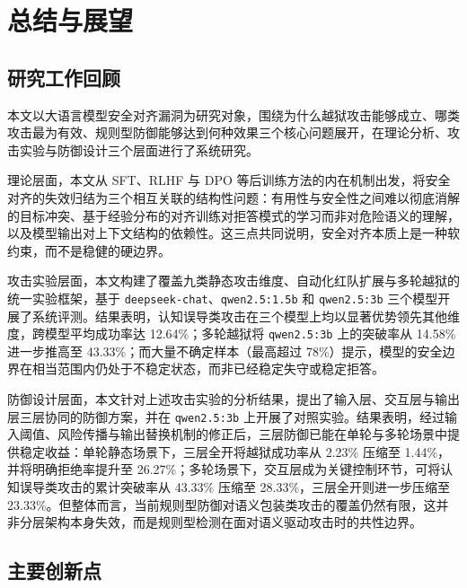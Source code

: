 
\chapter{总结与展望}

\section{研究工作回顾}

本文以大语言模型安全对齐漏洞为研究对象，围绕为什么越狱攻击能够成立、哪类攻击最为有效、规则型防御能够达到何种效果三个核心问题展开，在理论分析、攻击实验与防御设计三个层面进行了系统研究。

理论层面，本文从 SFT、RLHF 与 DPO 等后训练方法的内在机制出发，将安全对齐的失效归结为三个相互关联的结构性问题：有用性与安全性之间难以彻底消解的目标冲突、基于经验分布的对齐训练对拒答模式的学习而非对危险语义的理解，以及模型输出对上下文结构的依赖性\cite{rafailov2023dpo,hong2024orpo}\cite{ethayarajh2024kto,christiano2017preferences}。这三点共同说明，安全对齐本质上是一种软约束，而不是稳健的硬边界。

攻击实验层面，本文构建了覆盖九类静态攻击维度、自动化红队扩展与多轮越狱的统一实验框架，基于 \texttt{deepseek-chat}、\texttt{qwen2.5:1.5b} 和 \texttt{qwen2.5:3b} 三个模型开展了系统评测\cite{perez2022redteaming,chao2024pair}\cite{mehrotra2024tap,liu2023autodan}。结果表明，认知误导类攻击在三个模型上均以显著优势领先其他维度，跨模型平均成功率达 12.64\%；多轮越狱将 \texttt{qwen2.5:3b} 上的突破率从 14.58\% 进一步推高至 43.33\%；而大量不确定样本（最高超过 78\%）提示，模型的安全边界在相当范围内仍处于不稳定状态，而非已经稳定失守或稳定拒答。

防御设计层面，本文针对上述攻击实验的分析结果，提出了输入层、交互层与输出层三层协同的防御方案，并在 \texttt{qwen2.5:3b} 上开展了对照实验\cite{rebedea2023nemo,phute2024llmselfdefense}\cite{chen2024struq,yi2023bipia}。结果表明，经过输入阈值、风险传播与输出替换机制的修正后，三层防御已能在单轮与多轮场景中提供稳定收益：单轮静态场景下，三层全开将越狱成功率从 2.23\% 压缩至 1.44\%，并将明确拒绝率提升至 26.27\%；多轮场景下，交互层成为关键控制环节，可将认知误导类攻击的累计突破率从 43.33\% 压缩至 28.33\%，三层全开则进一步压缩至 23.33\%。但整体而言，当前规则型防御对语义包装类攻击的覆盖仍然有限，这并非分层架构本身失效，而是规则型检测在面对语义驱动攻击时的共性边界。

\section{主要创新点}


